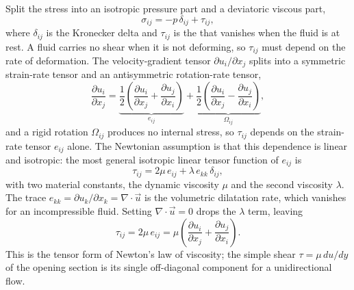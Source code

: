 

Split the stress into an isotropic pressure part and a deviatoric
viscous part,
\[
\sigma_{ij} = -p\,\delta_{ij} + \tau_{ij},
\]
where $\delta_{ij}$ is the Kronecker delta and $\tau_{ij}$ is the
 that vanishes when the fluid is at
rest. A fluid carries no shear when it is not deforming, so $\tau_{ij}$
must depend on the rate of deformation. The velocity-gradient tensor
$\partial u_i/\partial x_j$ splits into a symmetric strain-rate tensor
and an antisymmetric rotation-rate tensor,
\[
\frac{\partial u_i}{\partial x_j} = \underbrace{\frac12\!\left(
\frac{\partial u_i}{\partial x_j} + \frac{\partial u_j}{\partial x_i}
\right)}_{\displaystyle e_{ij}} + \underbrace{\frac12\!\left(
\frac{\partial u_i}{\partial x_j} - \frac{\partial u_j}{\partial x_i}
\right)}_{\displaystyle \Omega_{ij}},
\]
and a rigid rotation $\Omega_{ij}$ produces no internal stress, so
$\tau_{ij}$ depends on the strain-rate tensor $e_{ij}$ alone. The
Newtonian assumption is that this dependence is linear and isotropic:
the most general isotropic linear tensor function of $e_{ij}$ is
\[
\tau_{ij} = 2\mu\,e_{ij} + \lambda\,e_{kk}\,\delta_{ij},
\]
with two material constants, the dynamic viscosity $\mu$ and the second
viscosity $\lambda$. The trace $e_{kk} = \partial u_k/\partial x_k =
\nabla\cdot\vec u$ is the volumetric dilatation rate, which vanishes for
an incompressible fluid. Setting $\nabla\cdot\vec u = 0$ drops the
$\lambda$ term, leaving
\[
\tau_{ij} = 2\mu\,e_{ij} = \mu\!\left(\frac{\partial u_i}{\partial x_j}
+ \frac{\partial u_j}{\partial x_i}\right).
\]
This is the tensor form of Newton's law of viscosity; the simple shear
$\tau = \mu\,du/dy$ of the opening section is its single off-diagonal
component for a unidirectional flow.

